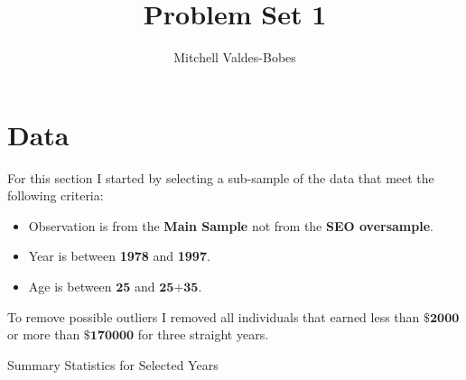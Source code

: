 \documentclass[12pt]{article}
\begin{document}
\title{Problem Set 1 }
\author{Mitchell Valdes-Bobes}
\maketitle



\section{Data}

For this section I started by selecting a sub-sample of the data that meet the following criteria:
\begin{itemize}
    \item Observation is from the \textbf{Main Sample} not from the \textbf{SEO oversample}.
    \item Year is between \textbf{1978} and \textbf{1997}.
    \item Age is between $\textbf{25}$ and $\textbf{25+35}$.
\end{itemize}

To remove possible outliers I removed all individuals that earned less than $\textbf{\$2000}$ or more than $\textbf{\$170000}$ for three straight years. 

\begin{center}
\begin{table}[h!]\caption{Summary Statistics for Selected Years}

\end{table}
\end{center}
\end{document}
